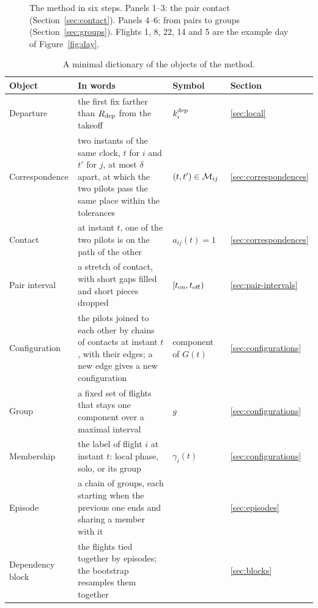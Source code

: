 \begin{figure}
\caption{The method in six steps. Panels 1--3: the pair contact (Section~\ref{sec:contact}).
Panels 4--6: from pairs to groups (Section~\ref{sec:groups}). Flights 1, 8, 22, 14 and 5 are the
example day of Figure~\ref{fig:day}.}
\label{fig:overview}
\end{figure}

\begin{table}
\centering
\small
\begin{tabularx}{\textwidth}{@{}l X l l@{}}
\toprule
Object & In words & Symbol & Section \\
\midrule
Departure & the first fix farther than $R_{\mathrm{dep}}$ from the takeoff & $k_i^{\mathrm{dep}}$ & \ref{sec:local} \\
Correspondence & two instants of the same clock, $t$ for $i$ and $t'$ for $j$, at most $\delta$ apart, at which the two pilots pass the same place within the tolerances & $(t,t')\in\mathcal{M}_{ij}$ & \ref{sec:correspondences} \\
Contact & at instant $t$, one of the two pilots is on the path of the other & $a_{ij}(t)=1$ & \ref{sec:correspondences} \\
Pair interval & a stretch of contact, with short gaps filled and short pieces dropped & $[t_{\rm on},t_{\rm off})$ & \ref{sec:pair-intervals} \\
Configuration & the pilots joined to each other by chains of contacts at instant $t$, with their edges; a new edge gives a new configuration & component of $G(t)$ & \ref{sec:configurations} \\
Group & a fixed set of flights that stays one component over a maximal interval & $g$ & \ref{sec:configurations} \\
Membership & the label of flight $i$ at instant $t$: local phase, solo, or its group & $\gamma_i(t)$ & \ref{sec:configurations} \\
Episode & a chain of groups, each starting when the previous one ends and sharing a member with it & & \ref{sec:episodes} \\
Dependency block & the flights tied together by episodes; the bootstrap resamples them together & & \ref{sec:blocks} \\
\bottomrule
\end{tabularx}
\caption{A minimal dictionary of the objects of the method.}
\label{tab:glossary}
\end{table}

